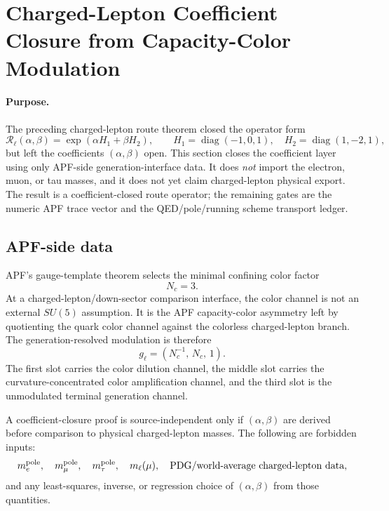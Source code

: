 
\section{Charged-Lepton Coefficient Closure from Capacity-Color Modulation}
\label{sec:charged-lepton-coefficient-closure-v39}

\paragraph{Purpose.}
The preceding charged-lepton route theorem closed the operator form
\[
        \mathcal R_\ell(\alpha,\beta)
        =\exp\!\left(\alpha H_1+\beta H_2\right),
        \qquad
        H_1=\operatorname{diag}(-1,0,1),\quad
        H_2=\operatorname{diag}(1,-2,1),
\]
but left the coefficients $(\alpha,\beta)$ open.  This section closes the
coefficient layer using only APF-side generation-interface data.  It does
\emph{not} import the electron, muon, or tau masses, and it does not yet claim
charged-lepton physical export.  The result is a coefficient-closed route
operator; the remaining gates are the numeric APF trace vector and the
QED/pole/running scheme transport ledger.

\subsection{APF-side data}

\begin{definition}
APF's gauge-template theorem selects the minimal confining color factor
\[
        N_c=3.
\]
At a charged-lepton/down-sector comparison interface, the color channel is not
an external $SU(5)$ assumption.  It is the APF capacity-color asymmetry left
by quotienting the quark color channel against the colorless charged-lepton
branch.  The generation-resolved modulation is therefore
\[
        g_\ell=(N_c^{-1},\,N_c,\,1).
\]
The first slot carries the color dilution channel, the middle slot carries the
curvature-concentrated color amplification channel, and the third slot is the
unmodulated terminal generation channel.
\end{definition}

\begin{definition}
A coefficient-closure proof is source-independent only if $(\alpha,\beta)$ are
derived before comparison to physical charged-lepton masses.  The following are
forbidden inputs:
\[
        m_e^{\rm pole},\quad
        m_\mu^{\rm pole},\quad
        m_\tau^{\rm pole},\quad
        m_\ell(\mu),\quad
        \text{PDG/world-average charged-lepton data},
\]
and any least-squares, inverse, or regression choice of $(\alpha,\beta)$ from
those quantities.
\end{definition}

